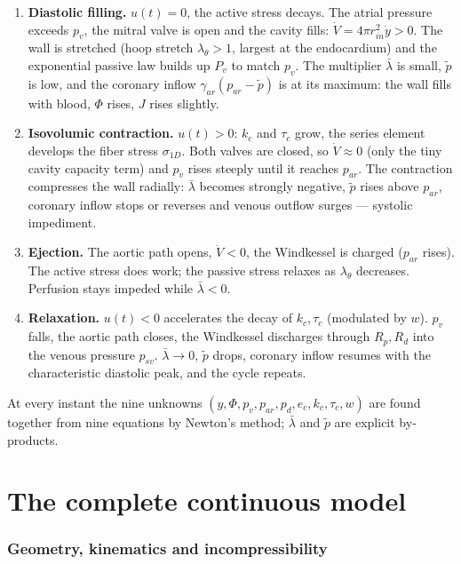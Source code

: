 \documentclass[11pt,a4paper]{article}
\newcommand{\rin}{r_{in}}
\newcommand{\lt}{\lambda_\theta}
\newcommand{\lb}{\bar\lambda}
\newcommand{\pf}{\tilde p}
\newcommand{\sig}{\sigma_{1D}}
\begin{document}
\begin{enumerate}[leftmargin=2em]
\item \textbf{Diastolic filling.} $u(t)=0$, the active stress decays. The atrial pressure exceeds $p_v$, the mitral valve is open and the cavity fills: $\dot V=4\pi\rin^2\dot y>0$. The wall is stretched (hoop stretch $\lt>1$, largest at the endocardium) and the exponential passive law builds up $P_v$ to match $p_v$. The multiplier $\lb$ is small, $\pf$ is low, and the coronary inflow $\gamma_{ar}(p_{ar}-\pf)$ is at its maximum: the wall fills with blood, $\Phi$ rises, $J$ rises slightly.
\item \textbf{Isovolumic contraction.} $u(t)>0$: $k_c$ and $\tau_c$ grow, the series element develops the fiber stress $\sig$. Both valves are closed, so $\dot V\approx 0$ (only the tiny cavity capacity term) and $p_v$ rises steeply until it reaches $p_{ar}$. The contraction compresses the wall radially: $\lb$ becomes strongly negative, $\pf$ rises above $p_{ar}$, coronary inflow stops or reverses and venous outflow surges --- systolic impediment.
\item \textbf{Ejection.} The aortic path opens, $\dot V<0$, the Windkessel is charged ($p_{ar}$ rises). The active stress does work; the passive stress relaxes as $\lt$ decreases. Perfusion stays impeded while $\lb<0$.
\item \textbf{Relaxation.} $u(t)<0$ accelerates the decay of $k_c,\tau_c$ (modulated by $w$). $p_v$ falls, the aortic path closes, the Windkessel discharges through $R_p,R_d$ into the venous pressure $p_{sv}$. $\lb\to 0$, $\pf$ drops, coronary inflow resumes with the characteristic diastolic peak, and the cycle repeats.
\end{enumerate}
At every instant the nine unknowns $(y,\Phi,p_v,p_{ar},p_d,e_c,k_c,\tau_c,w)$ are found together from nine equations by Newton's method; $\lb$ and $\pf$ are explicit by-products.

\part{The complete continuous model}

\section{Geometry, kinematics and incompressibility}
\end{document}
